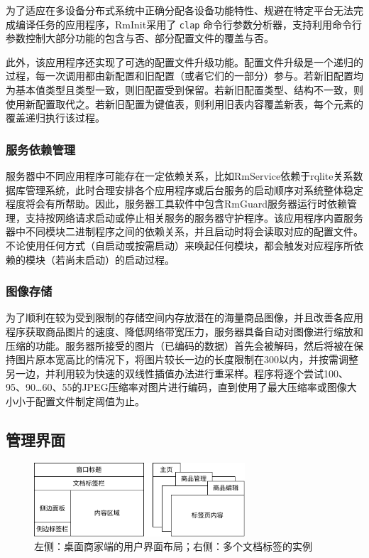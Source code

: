 为了适应在多设备分布式系统中正确分配各设备功能特性、规避在特定平台无法完成编译任务的应用程序，RmInit采用了 \verb|clap| 命令行参数分析器，支持利用命令行参数控制大部分功能的包含与否、部分配置文件的覆盖与否。

此外，该应用程序还实现了可选的配置文件升级功能。配置文件升级是一个递归的过程，每一次调用都由新配置和旧配置（或者它们的一部分）参与。若新旧配置均为基本值类型且类型一致，则旧配置受到保留。若新旧配置类型、结构不一致，则使用新配置取代之。若新旧配置为键值表，则利用旧表内容覆盖新表，每个元素的覆盖递归执行该过程。

\subsubsection{服务依赖管理}
服务器中不同应用程序可能存在一定依赖关系，比如RmService依赖于rqlite关系数据库管理系统，此时合理安排各个应用程序或后台服务的启动顺序对系统整体稳定程度将会有所帮助。因此，服务器工具软件中包含RmGuard服务器运行时依赖管理，支持按网络请求启动或停止相关服务的服务器守护程序。该应用程序内置服务器中不同模块二进制程序之间的依赖关系，并且启动时将会读取对应的配置文件。不论使用任何方式（自启动或按需启动）来唤起任何模块，都会触发对应程序所依赖的模块（若尚未启动）的启动过程。

\subsubsection{图像存储}
为了顺利在较为受到限制的存储空间内存放潜在的海量商品图像，并且改善各应用程序获取商品图片的速度、降低网络带宽压力，服务器具备自动对图像进行缩放和压缩的功能。服务器所接受的图片（已编码的数据）首先会被解码，然后将被在保持图片原本宽高比的情况下，将图片较长一边的长度限制在300以内，并按需调整另一边，并利用较为快速的双线性插值办法进行重采样。程序将逐个尝试100、95、90\ldots60、55的JPEG压缩率对图片进行编码，直到使用了最大压缩率或图像大小小于配置文件制定阈值为止。

\subsection{管理界面}

\begin{figure}[htbp]
	\centering
	\includegraphics[width=0.7\textwidth]{./imgs/rma-design-layout.png}
	\caption{左侧：桌面商家端的用户界面布局；右侧：多个文档标签的实例}
	\label{fig:rma-design-layout}
\end{figure}

